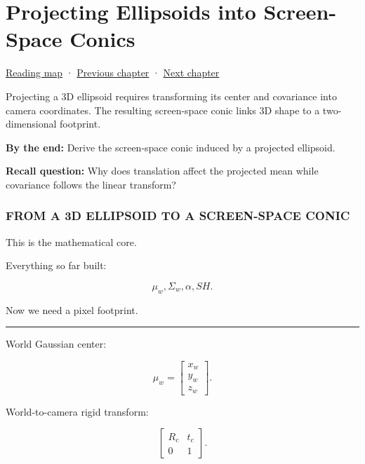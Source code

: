 \hypertarget{04-visual-computing-ii-ch038}{}
\chapter{Projecting Ellipsoids into Screen-Space Conics}\label{stagechapter:04-visual-computing-ii-ch038}\label{04-visual-computing-ii-ch038-projecting-ellipsoids-into-screen-space-conics}

\hyperref[volume-reading-map]{Reading map} · \hyperref[04-visual-computing-ii-ch037-gaussian-splatting-and-editable-captured-worlds]{Previous chapter} · \hyperref[04-visual-computing-ii-ch039-tiling-ordering-and-compositing-at-scale]{Next chapter}

Projecting a 3D ellipsoid requires transforming its center and covariance into camera coordinates. The resulting screen-space conic links 3D shape to a two-dimensional footprint.

\textbf{By the end:} Derive the screen-space conic induced by a projected ellipsoid.

\textbf{Recall question:} Why does translation affect the projected mean while covariance follows the linear transform?

\subsection{FROM A 3D ELLIPSOID TO A SCREEN-SPACE CONIC}\label{04-visual-computing-ii-ch038-from-a-3d-ellipsoid-to-a-screen-space-conic}

This is the mathematical core.

Everything so far built:

\[
\mu_w,
\Sigma_w,
\alpha,
SH.
\]

Now we need a pixel footprint.

\begin{center}\rule{0.5\linewidth}{0.5pt}\end{center}

World Gaussian center:

\[
\mu_w=
\begin{bmatrix}
x_w\\y_w\\z_w
\end{bmatrix}.
\]

World-to-camera rigid transform:

\[
\begin{bmatrix}
R_c&t_c\\
0&1
\end{bmatrix}.
\]

